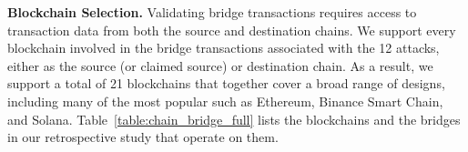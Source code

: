 \textbf{Blockchain Selection.}
%
Validating bridge transactions requires access to
transaction data from both the source and destination chains.  We
support every blockchain involved in the bridge transactions
associated with the 12 attacks, either as the source (or claimed
source) or destination chain.  As a result, we support a total of 21
blockchains that together cover a
broad range of designs, including many of the most popular such as 
Ethereum, Binance Smart Chain, and Solana.
%
Table~\ref{table:chain_bridge_full} lists the blockchains and the
bridges in our retrospective study that operate on them.%










